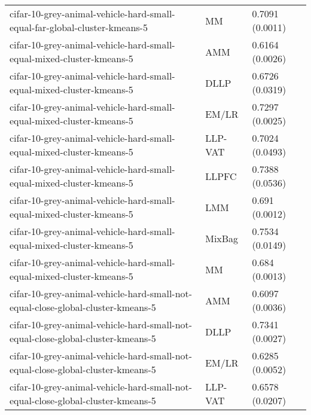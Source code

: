 \begin{longtable}{lll}
                                    cifar-10-grey-animal-vehicle-hard-small-equal-far-global-cluster-kmeans-5 &        MM &                           0.7091 (0.0011) \\
                                         cifar-10-grey-animal-vehicle-hard-small-equal-mixed-cluster-kmeans-5 &       AMM &                           0.6164 (0.0026) \\
                                         cifar-10-grey-animal-vehicle-hard-small-equal-mixed-cluster-kmeans-5 &      DLLP &                           0.6726 (0.0319) \\
                                         cifar-10-grey-animal-vehicle-hard-small-equal-mixed-cluster-kmeans-5 &     EM/LR &                           0.7297 (0.0025) \\
                                         cifar-10-grey-animal-vehicle-hard-small-equal-mixed-cluster-kmeans-5 &   LLP-VAT &                           0.7024 (0.0493) \\
                                         cifar-10-grey-animal-vehicle-hard-small-equal-mixed-cluster-kmeans-5 &     LLPFC &                           0.7388 (0.0536) \\
                                         cifar-10-grey-animal-vehicle-hard-small-equal-mixed-cluster-kmeans-5 &       LMM &                            0.691 (0.0012) \\
                                         cifar-10-grey-animal-vehicle-hard-small-equal-mixed-cluster-kmeans-5 &    MixBag &                           0.7534 (0.0149) \\
                                         cifar-10-grey-animal-vehicle-hard-small-equal-mixed-cluster-kmeans-5 &        MM &                            0.684 (0.0013) \\
                              cifar-10-grey-animal-vehicle-hard-small-not-equal-close-global-cluster-kmeans-5 &       AMM &                           0.6097 (0.0036) \\
                              cifar-10-grey-animal-vehicle-hard-small-not-equal-close-global-cluster-kmeans-5 &      DLLP &                           0.7341 (0.0027) \\
                              cifar-10-grey-animal-vehicle-hard-small-not-equal-close-global-cluster-kmeans-5 &     EM/LR &                           0.6285 (0.0052) \\
                              cifar-10-grey-animal-vehicle-hard-small-not-equal-close-global-cluster-kmeans-5 &   LLP-VAT &                           0.6578 (0.0207) \\

\end{longtable}
